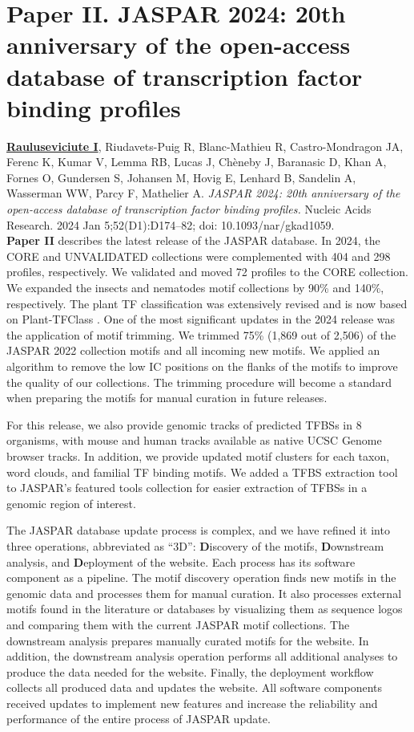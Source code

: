 \section{Paper II. JASPAR 2024: 20th anniversary of the open-access database of transcription factor binding profiles}

\textbf{\underline{Rauluseviciute I}}\footnotemark[1], Riudavets-Puig R\footnotemark[1], Blanc-Mathieu R, Castro-Mondragon JA, Ferenc K, Kumar V, Lemma RB, Lucas J, Chèneby J, Baranasic D, Khan A, Fornes O, Gundersen S, Johansen M, Hovig E, Lenhard B, Sandelin A, Wasserman WW, Parcy F, Mathelier A. \textit{JASPAR 2024: 20th anniversary of the open-access database of transcription factor binding profiles.} Nucleic Acids Research. 2024 Jan 5;52(D1):D174--82; doi: 10.1093/nar/gkad1059.
\\

\textbf{Paper II} describes the latest release of the JASPAR database. In 2024, the CORE and UNVALIDATED collections were complemented with 404 and 298 profiles, respectively. We validated and moved 72 profiles to the CORE collection. We expanded the insects and nematodes motif collections by 90\% and 140\%, respectively. The plant TF classification was extensively revised and is now based on Plant-TFClass \cite{blanc2024plant}. One of the most significant updates in the 2024 release was the application of motif trimming. We trimmed 75\% (1,869 out of 2,506) of the JASPAR 2022 collection motifs and all incoming new motifs. We applied an algorithm to remove the low IC positions on the flanks of the motifs to improve the quality of our collections. The trimming procedure will become a standard when preparing the motifs for manual curation in future releases.

For this release, we also provide genomic tracks of predicted TFBSs in 8 organisms, with mouse and human tracks available as native UCSC Genome browser tracks. In addition, we provide updated motif clusters for each taxon, word clouds, and familial TF binding motifs. We added a TFBS extraction tool to JASPAR's featured tools collection for easier extraction of TFBSs in a genomic region of interest.

The JASPAR database update process is complex, and we have refined it into three operations, abbreviated as ``3D'': \textbf{D}iscovery of the motifs, \textbf{D}ownstream analysis, and \textbf{D}eployment of the website. Each process has its software component as a pipeline. The motif discovery operation finds new motifs in the genomic data and processes them for manual curation. It also processes external motifs found in the literature or databases by visualizing them as sequence logos and comparing them with the current JASPAR motif collections. The downstream analysis prepares manually curated motifs for the website. In addition, the downstream analysis operation performs all additional analyses to produce the data needed for the website. Finally, the deployment workflow collects all produced data and updates the website. All software components received updates to implement new features and increase the reliability and performance of the entire process of JASPAR update.

